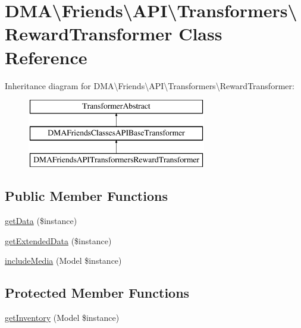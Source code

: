 \hypertarget{classDMA_1_1Friends_1_1API_1_1Transformers_1_1RewardTransformer}{}\section{D\+M\+A\textbackslash{}Friends\textbackslash{}A\+P\+I\textbackslash{}Transformers\textbackslash{}Reward\+Transformer Class Reference}
\label{classDMA_1_1Friends_1_1API_1_1Transformers_1_1RewardTransformer}
Inheritance diagram for D\+M\+A\textbackslash{}Friends\textbackslash{}A\+P\+I\textbackslash{}Transformers\textbackslash{}Reward\+Transformer\+:\begin{figure}[H]
\begin{center}
\leavevmode
\includegraphics[height=3.000000cm]{dc/d52/classDMA_1_1Friends_1_1API_1_1Transformers_1_1RewardTransformer}
\end{center}
\end{figure}
\subsection*{Public Member Functions}
\begin{DoxyCompactItemize}
\item 
\hyperlink{classDMA_1_1Friends_1_1API_1_1Transformers_1_1RewardTransformer_af31e197944fa087eb405f839bbb50434}{get\+Data} (\$instance)
\item 
\hyperlink{classDMA_1_1Friends_1_1API_1_1Transformers_1_1RewardTransformer_a55b0731a2321e60950517e0b23e92ad7}{get\+Extended\+Data} (\$instance)
\item 
\hyperlink{classDMA_1_1Friends_1_1API_1_1Transformers_1_1RewardTransformer_a152cedfbf193807324c4aaa64edbae4e}{include\+Media} (Model \$instance)
\end{DoxyCompactItemize}
\subsection*{Protected Member Functions}
\begin{DoxyCompactItemize}
\item 
\hyperlink{classDMA_1_1Friends_1_1API_1_1Transformers_1_1RewardTransformer_a9bfaced3e5a688c95c5379540bb071c1}{get\+Inventory} (Model \$instance)
\end{DoxyCompactItemize}
